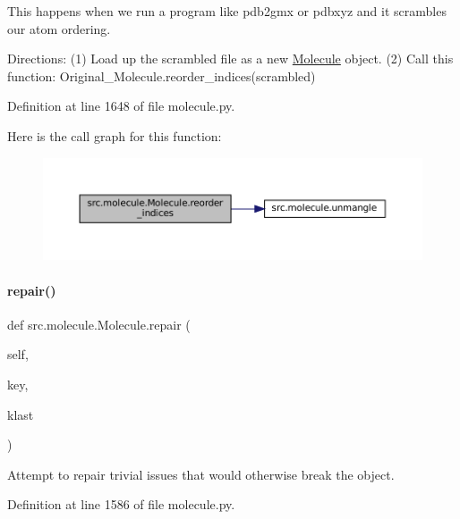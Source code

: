 This happens when we run a program like pdb2gmx or pdbxyz and it scrambles our atom ordering.

Directions\+: (1) Load up the scrambled file as a new \hyperlink{classsrc_1_1molecule_1_1Molecule}{Molecule} object. (2) Call this function\+: Original\+\_\+\+Molecule.\+reorder\+\_\+indices(scrambled) 

Definition at line 1648 of file molecule.\+py.

Here is the call graph for this function\+:
\nopagebreak
\begin{figure}[H]
\begin{center}
\leavevmode
\includegraphics[width=350pt]{classsrc_1_1molecule_1_1Molecule_a9f764980b8a0df810aa7264036617975_cgraph}
\end{center}
\end{figure}
\mbox{\label{classsrc_1_1molecule_1_1Molecule_aaf70e66c397fd1e77644339ec81dfa9e}} 
\paragraph{\texorpdfstring{repair()}{repair()}}
{\footnotesize\ttfamily def src.\+molecule.\+Molecule.\+repair (\begin{DoxyParamCaption}\item[{}]{self,  }\item[{}]{key,  }\item[{}]{klast }\end{DoxyParamCaption})}



Attempt to repair trivial issues that would otherwise break the object. 



Definition at line 1586 of file molecule.\+py.


